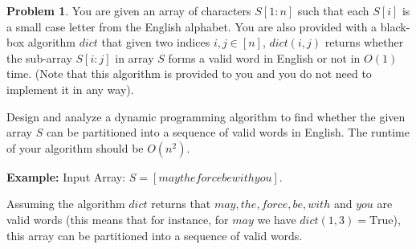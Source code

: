 \documentclass{article}
\theoremstyle{definition}
\newtheorem{problem}{Problem}
\begin{document}
\begin{problem}
  You are given an array of characters $S[1:n]$ such that each $S[i]$ is a small case letter from the English alphabet.
  You are also provided with a black-box algorithm $dict$ that given two indices $i,j \in [n]$, $dict(i,j)$ returns whether the sub-array $S[i:j]$ in array $S$ forms a valid word in English or not in $O(1)$ time. (Note that this algorithm is provided to you and you
  do not need to implement it in any way).

  Design and analyze a dynamic programming algorithm to find whether the given array $S$ can be partitioned into a sequence of valid words in English. The  runtime of your algorithm should be $O(n^2)$.

  \textbf{Example:} Input Array: $S=[maytheforcebewithyou]$.

  Assuming the algorithm $dict$ returns that $may, the, force, be, with$ and  $you$ are valid words (this means that for instance, for $may$ we have $dict(1,3)=\text{True}$), this array can be partitioned into a sequence of valid words.

\end{problem}
\end{document}
